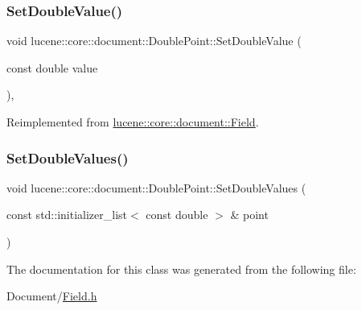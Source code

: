 \mbox{\label{classlucene_1_1core_1_1document_1_1DoublePoint_a71a14c1578c356e006c422f2c8a267b8}} 
\subsubsection{\texorpdfstring{Set\+Double\+Value()}{SetDoubleValue()}}
{\footnotesize\ttfamily void lucene\+::core\+::document\+::\+Double\+Point\+::\+Set\+Double\+Value (\begin{DoxyParamCaption}\item[{const double}]{value }\end{DoxyParamCaption})\hspace{0.3cm}{\ttfamily [inline]}, {\ttfamily [virtual]}}



Reimplemented from \mbox{\hyperlink{classlucene_1_1core_1_1document_1_1Field_a8db791d4d1ebf77288d8529214413810}{lucene\+::core\+::document\+::\+Field}}.

\mbox{\label{classlucene_1_1core_1_1document_1_1DoublePoint_afcc80550e3b4ca606c601304782c1998}} 
\subsubsection{\texorpdfstring{Set\+Double\+Values()}{SetDoubleValues()}}
{\footnotesize\ttfamily void lucene\+::core\+::document\+::\+Double\+Point\+::\+Set\+Double\+Values (\begin{DoxyParamCaption}\item[{const std\+::initializer\+\_\+list$<$ const double $>$ \&}]{point }\end{DoxyParamCaption})\hspace{0.3cm}{\ttfamily [inline]}}



The documentation for this class was generated from the following file\+:\begin{DoxyCompactItemize}
\item 
Document/\mbox{\hyperlink{Document_2Field_8h}{Field.\+h}}\end{DoxyCompactItemize}
